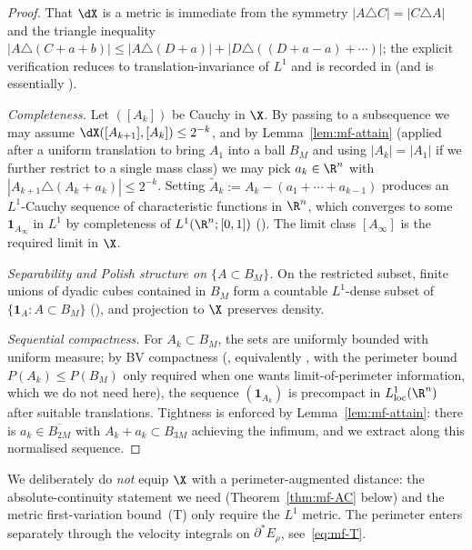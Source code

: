 \begin{proof}
That $\dX$ is a metric is immediate from the symmetry $|A\triangle C|=
|C\triangle A|$ and the triangle inequality
$|A\triangle(C+a+b)|\le|A\triangle(D+a)|+|D\triangle((D+a-a)+ \cdots)|$;
the explicit verification reduces to translation-invariance of $L^1$ and is
recorded in \cite[Def.~2.1, Lem.~2.2]{AmbrosioGigli2013} (and is essentially
\cite[Def.~5.5.1]{AGS2008}).

\emph{Completeness.} Let $([A_k])$ be Cauchy in $\X$. By passing to a
subsequence we may assume
$\dX([A_{k+1}],[A_k])\le 2^{-k}$, and by Lemma~\ref{lem:mf-attain} (applied
after a uniform translation to bring $A_1$ into a ball $B_M$ and using
$|A_k|=|A_1|$ if we further restrict to a single mass class) we may pick
$a_k\in\R^n$ with $|A_{k+1}\triangle(A_k+a_k)|\le 2^{-k}$. Setting
$\widetilde A_k:=A_k-(a_1+\cdots+a_{k-1})$ produces an $L^1$-Cauchy sequence
of characteristic functions in $\R^n$, which converges to some
$\mathbf 1_{A_\infty}$ in $L^1$ by completeness of
$L^1(\R^n;[0,1])$ (\cite[Prop.~12.10]{Maggi2012}). The limit class
$[A_\infty]$ is the required limit in $\X$.

\emph{Separability and Polish structure on $\{A\subset B_M\}$.} On the
restricted subset, finite unions of dyadic cubes contained in $B_M$ form a
countable $L^1$-dense subset of $\{\mathbf 1_A:A\subset B_M\}$
(\cite[Thm.~1.18]{Maggi2012}), and projection to $\X$ preserves density.

\emph{Sequential compactness.} For $A_k\subset B_M$, the sets are uniformly
bounded with uniform measure; by BV compactness
(\cite[Thm.~12.26]{Maggi2012}, equivalently \cite[Thm.~3.23]{AFP2000}, with
the perimeter bound $P(A_k)\le P(B_M)$ only required when one wants
limit-of-perimeter information, which we do not need here), the sequence
$(\mathbf 1_{A_k})$ is precompact in $L^1_{\rm loc}(\R^n)$ after suitable
translations. Tightness is enforced by Lemma~\ref{lem:mf-attain}: there is
$a_k\in\overline{B_{2M}}$ with $A_k+a_k\subset B_{3M}$ achieving the
infimum, and we extract along this normalised sequence.
\end{proof}

\begin{remark}\label{rem:no-perim}
We deliberately do \emph{not} equip $\X$ with a perimeter-augmented distance:
the absolute-continuity statement we need (Theorem~\ref{thm:mf-AC} below) and
the metric first-variation bound~(T) only require the $L^1$ metric. The
perimeter enters separately through the velocity integrals on
$\partial^*E_\rho$, see~\eqref{eq:mf-T}.
\end{remark}

